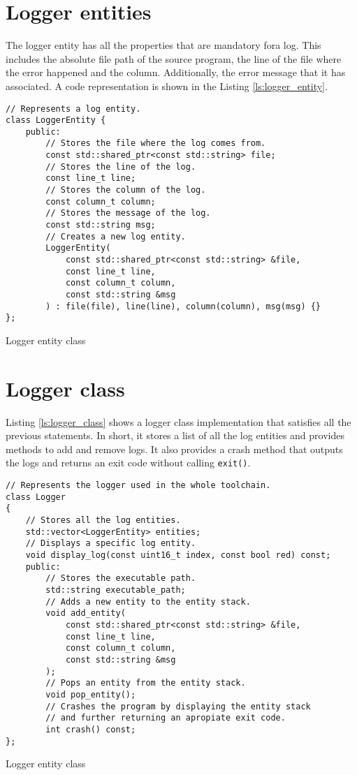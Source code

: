 \section{Logger entities}

The logger entity has all the properties that are mandatory fora log.
This includes the absolute file path of the source program, the line of the file where the error happened
and the column. Additionally, the error message that it has associated. A code representation is shown in
the Listing \autoref{ls:logger_entity}.

\begin{listing}[H]
\begin{verbatim}
// Represents a log entity.
class LoggerEntity {
    public:
        // Stores the file where the log comes from.
        const std::shared_ptr<const std::string> file;
        // Stores the line of the log.
        const line_t line;
        // Stores the column of the log.
        const column_t column;
        // Stores the message of the log.
        const std::string msg;
        // Creates a new log entity.
        LoggerEntity(
            const std::shared_ptr<const std::string> &file,
            const line_t line,
            const column_t column,
            const std::string &msg
        ) : file(file), line(line), column(column), msg(msg) {}
};
\end{verbatim}
\caption{Logger entity class}
\label{ls:logger_entity}
\end{listing}

\section{Logger class}

Listing \autoref{ls:logger_class} shows a logger class implementation that satisfies all the previous statements.
In short, it stores a list of all the log entities and provides methods to add and remove logs. It also provides a crash
method that outputs the logs and returns an exit code without calling \texttt{exit()}.

\begin{listing}[H]
\begin{verbatim}
// Represents the logger used in the whole toolchain.
class Logger
{
    // Stores all the log entities.
    std::vector<LoggerEntity> entities;
    // Displays a specific log entity.
    void display_log(const uint16_t index, const bool red) const;
    public:
        // Stores the executable path.
        std::string executable_path;
        // Adds a new entity to the entity stack.
        void add_entity(
            const std::shared_ptr<const std::string> &file,
            const line_t line,
            const column_t column,
            const std::string &msg
        );
        // Pops an entity from the entity stack.
        void pop_entity();
        // Crashes the program by displaying the entity stack
        // and further returning an apropiate exit code.
        int crash() const;
};
\end{verbatim}
\caption{Logger entity class}
\label{ls:logger_class}
\end{listing}

